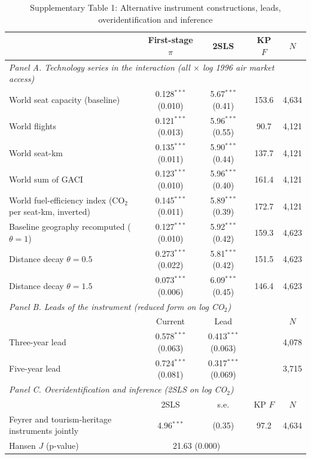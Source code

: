 \documentclass[12pt]{article}
\begin{document}
\begin{table}[htbp]
\centering
\begin{threeparttable}
\caption{Supplementary Table 1: Alternative instrument constructions, leads, overidentification and inference}
\label{tab:exclusion2}
\scriptsize
\begin{tabular}{lcccc}
\toprule
 & First-stage $\pi$ & 2SLS & KP $F$ & $N$ \\
\midrule
\multicolumn{5}{l}{\textit{Panel A. Technology series in the interaction (all $\times$ log 1996 air market access)}} \\
  World seat capacity (baseline) & 0.128$^{***}$ (0.010) & 5.67$^{***}$ (0.41) & 153.6 & 4,634 \\
  World flights & 0.121$^{***}$ (0.013) & 5.96$^{***}$ (0.55) & 90.7 & 4,121 \\
  World seat-km & 0.135$^{***}$ (0.011) & 5.90$^{***}$ (0.44) & 137.7 & 4,121 \\
  World sum of GACI & 0.123$^{***}$ (0.010) & 5.96$^{***}$ (0.40) & 161.4 & 4,121 \\
  World fuel-efficiency index (CO$_2$ per seat-km, inverted) & 0.145$^{***}$ (0.011) & 5.89$^{***}$ (0.39) & 172.7 & 4,121 \\
  Baseline geography recomputed ($\theta = 1$) & 0.127$^{***}$ (0.010) & 5.92$^{***}$ (0.42) & 159.3 & 4,623 \\
  Distance decay $\theta = 0.5$ & 0.273$^{***}$ (0.022) & 5.81$^{***}$ (0.42) & 151.5 & 4,623 \\
  Distance decay $\theta = 1.5$ & 0.073$^{***}$ (0.006) & 6.09$^{***}$ (0.45) & 146.4 & 4,623 \\
\midrule
\multicolumn{5}{l}{\textit{Panel B. Leads of the instrument (reduced form on log CO$_2$)}} \\
 & Current & Lead & & $N$ \\
  Three-year lead & 0.578$^{***}$ (0.063) & 0.413$^{***}$ (0.063) & & 4,078 \\
  Five-year lead & 0.724$^{***}$ (0.081) & 0.317$^{***}$ (0.069) & & 3,715 \\
\midrule
\multicolumn{5}{l}{\textit{Panel C. Overidentification and inference (2SLS on log CO$_2$)}} \\
 & 2SLS & s.e. & KP $F$ & $N$ \\
  Feyrer and tourism-heritage instruments jointly & 4.96$^{***}$ & (0.35) & 97.2 & 4,634 \\
  \quad Hansen $J$ (p-value) & \multicolumn{2}{c}{21.63 (0.000)} & & \\

\end{tabular}
\end{threeparttable}
\end{table}
\end{document}
